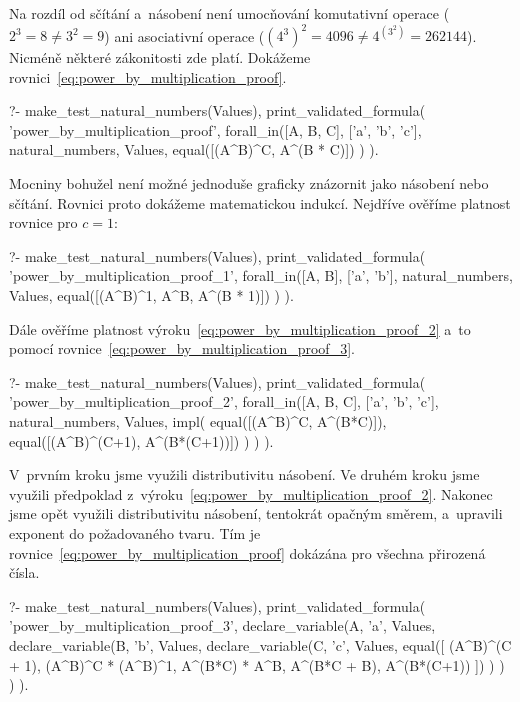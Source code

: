 Na rozdíl od sčítání a~násobení není umocňování komutativní operace (\(2^3 = 8 \neq 3^2 = 9\)) ani asociativní operace (\((4^3)^2 = 4096 \neq 4^{(3^2)} = 262144\)). Nicméně některé zákonitosti zde platí. Dokážeme rovnici~\eqref{eq:power_by_multiplication_proof}.

\begin{fact}
\begin{prolog}
?-	make_test_natural_numbers(Values),
	print_validated_formula(
		'power_by_multiplication_proof',
		forall_in([A, B, C], ['a', 'b', 'c'], natural_numbers, Values,
			equal([(A^B)^C, A^(B * C)])
		)
	).
\end{prolog}
\end{fact}

Mocniny bohužel není možné jednoduše graficky znázornit jako násobení nebo sčítání. Rovnici proto dokážeme matematickou indukcí. Nejdříve ověříme platnost rovnice pro \(c = 1\):

\begin{prolog}
?-	make_test_natural_numbers(Values),
	print_validated_formula(
		'power_by_multiplication_proof_1',
		forall_in([A, B], ['a', 'b'], natural_numbers, Values,
			equal([(A^B)^1, A^B, A^(B * 1)])
		)
	).
\end{prolog}

Dále ověříme platnost výroku~\eqref{eq:power_by_multiplication_proof_2} a~to pomocí rovnice~\eqref{eq:power_by_multiplication_proof_3}.

\begin{prolog}
?-	make_test_natural_numbers(Values),
	print_validated_formula(
		'power_by_multiplication_proof_2',
		forall_in([A, B, C], ['a', 'b', 'c'], natural_numbers, Values,
			impl(
				equal([(A^B)^C, 	A^(B*C)]),
				equal([(A^B)^(C+1), 	A^(B*(C+1))])
			)
		)
	).
\end{prolog}

V~prvním kroku jsme využili distributivitu násobení. Ve druhém kroku jsme využili předpoklad z~výroku~\eqref{eq:power_by_multiplication_proof_2}. Nakonec jsme opět využili distributivitu násobení, tentokrát opačným směrem, a~upravili exponent do požadovaného tvaru. Tím je rovnice~\eqref{eq:power_by_multiplication_proof} dokázána pro všechna přirozená čísla.

\begin{prolog}
?-	make_test_natural_numbers(Values),
	print_validated_formula(
		'power_by_multiplication_proof_3',
		declare_variable(A, 'a', Values,
			declare_variable(B, 'b', Values,
				declare_variable(C, 'c', Values,
					equal([
						(A^B)^(C + 1),
						(A^B)^C * (A^B)^1,
						A^(B*C) * A^B,
						A^(B*C + B),
						A^(B*(C+1))
					])
				)
			)
		)
	).
\end{prolog}

